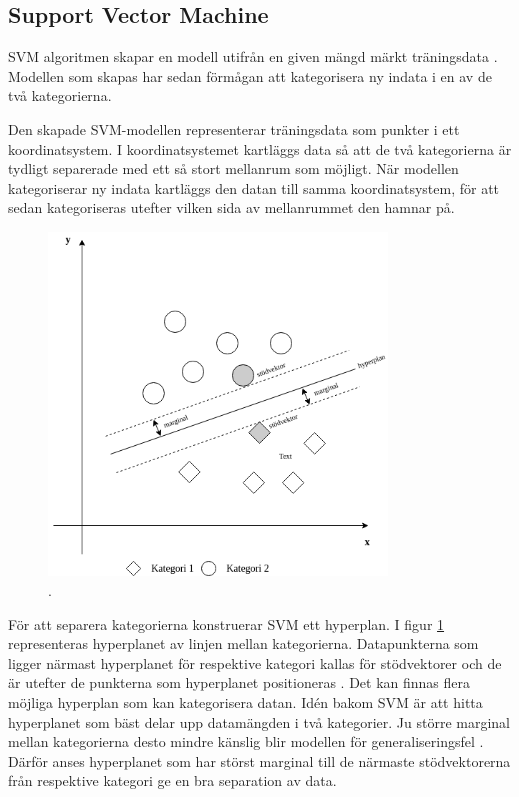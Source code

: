 \documentclass{kaumasters} %
\begin{document}
\subsection{Support Vector Machine}
SVM algoritmen skapar en modell utifrån en given mängd märkt träningsdata \cite{svm:002}. 
Modellen som skapas har sedan förmågan att kategorisera ny indata i en av de två kategorierna. 

Den skapade SVM-modellen representerar träningsdata som punkter i ett koordinatsystem. I koordinatsystemet kartläggs data så att de två kategorierna är tydligt separerade med ett så stort mellanrum som möjligt. När modellen kategoriserar ny indata kartläggs den datan till samma koordinatsystem, för att sedan kategoriseras utefter vilken sida av mellanrummet den hamnar på.

\begin{figure}[H]
\includegraphics[width=9cm]{linearsvm_hpwithmargins}
\centering
\caption{.}
\label{fig:svmmarg}
\end{figure}  

För att separera kategorierna konstruerar SVM ett hyperplan. I figur \ref{fig:svmmarg} representeras hyperplanet av linjen mellan kategorierna. Datapunkterna som ligger närmast hyperplanet för respektive kategori kallas för stödvektorer och de är utefter de punkterna som hyperplanet positioneras \cite{svm:003}. Det kan finnas flera möjliga hyperplan som kan kategorisera datan. Idén bakom SVM är att hitta hyperplanet som bäst delar upp datamängden i två kategorier. Ju större marginal mellan kategorierna desto mindre känslig blir modellen för generaliseringsfel \cite{svm:002}. Därför anses hyperplanet som har störst marginal till de närmaste stödvektorerna från respektive kategori ge en bra separation av data.
\end{document}
